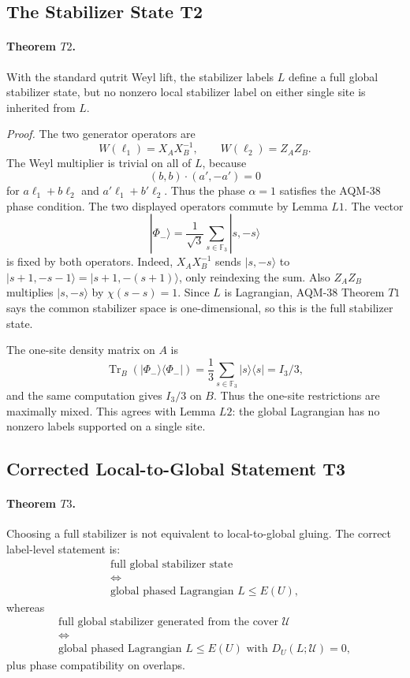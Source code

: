 \subsection{The Stabilizer State T2}

\paragraph{Theorem \(T2\).}
With the standard qutrit Weyl lift, the stabilizer labels \(L\) define a full
global stabilizer state, but no nonzero local stabilizer label on either
single site is inherited from \(L\).

\emph{Proof.}
The two generator operators are
\[
  W(\ell_1)=X_AX_B^{-1},\qquad W(\ell_2)=Z_AZ_B .
\]
The Weyl multiplier is trivial on all of \(L\), because
\[
  (b,b)\cdot(a',-a')=0
\]
for \(a\ell_1+b\ell_2\) and \(a'\ell_1+b'\ell_2\).  Thus the phase
\(\alpha=1\) satisfies the AQM-38 phase condition.  The two displayed
operators commute by Lemma \(L1\).  The vector
\[
  |\Phi_-\rangle=\frac1{\sqrt3}\sum_{s\in\mathbb F_3}|s,-s\rangle
\]
is fixed by both operators.  Indeed, \(X_AX_B^{-1}\) sends
\(|s,-s\rangle\) to \(|s+1,-s-1\rangle=|s+1,-(s+1)\rangle\), only
reindexing the sum.  Also \(Z_AZ_B\) multiplies \(|s,-s\rangle\) by
\(\chi(s-s)=1\).  Since \(L\) is Lagrangian, AQM-38 Theorem \(T1\) says the
common stabilizer space is one-dimensional, so this is the full stabilizer
state.

The one-site density matrix on \(A\) is
\[
  \operatorname{Tr}_B(|\Phi_-\rangle\langle\Phi_-|)
  =
  \frac13\sum_{s\in\mathbb F_3}|s\rangle\langle s|
  =
  I_3/3,
\]
and the same computation gives \(I_3/3\) on \(B\).  Thus the one-site
restrictions are maximally mixed.  This agrees with Lemma \(L2\): the global
Lagrangian has no nonzero labels supported on a single site.

\subsection{Corrected Local-to-Global Statement T3}

\paragraph{Theorem \(T3\).}
Choosing a full stabilizer is not equivalent to local-to-global gluing.  The
correct label-level statement is:
\[
\begin{array}{c}
\text{full global stabilizer state}\\
\Longleftrightarrow\\
\text{global phased Lagrangian }L\leq E(U),
\end{array}
\]
whereas
\[
\begin{array}{c}
\text{full global stabilizer generated from the cover }\mathcal U\\
\Longleftrightarrow\\
\text{global phased Lagrangian }L\leq E(U)\text{ with }
D_U(L;\mathcal U)=0,
\end{array}
\]
plus phase compatibility on overlaps.

